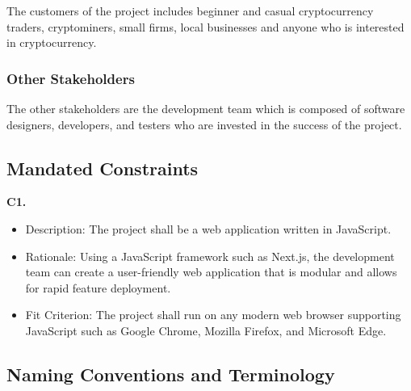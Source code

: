 \documentclass[12pt, titlepage]{article}
\begin{document}
The customers of the project includes beginner and casual cryptocurrency traders, cryptominers, small firms, local businesses and anyone who is interested in cryptocurrency.

\subsubsection{Other Stakeholders}

The other stakeholders are the development team which is composed of software designers, developers, and testers who are invested in the success of the project. 

\subsection{Mandated Constraints}
\textbf{C1.}
\begin{itemize}
    \item Description: The project shall be a web application written in JavaScript.
    \item Rationale: Using a JavaScript framework such as Next.js, the development team can create a user-friendly web application that is modular and allows for rapid feature deployment.
    \item Fit Criterion: The project shall run on any modern web browser supporting JavaScript such as Google Chrome, Mozilla Firefox, and Microsoft Edge.
\end{itemize}

\subsection{Naming Conventions and Terminology}
\end{document}
